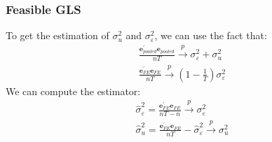 \documentclass{article}
\begin{document}
\subsubsection{Feasible GLS}
To get the estimation of $\sigma^2_u$ and $\sigma^2_{\varepsilon}$, we can use the fact that:
	\begin{align*}
		\frac{\boldsymbol{e}^\prime_{pooled} \boldsymbol{e}_{pooled}}{nT} \xrightarrow{p} \sigma^2_{\varepsilon} + \sigma^2_u\\
		\frac{\boldsymbol{e}^\prime_{FE} \boldsymbol{e}_{FE}}{nT} \xrightarrow{p} (1 - \frac{1}{T})\sigma^2_\varepsilon
	\end{align*}
We can compute the estimator:
	\begin{align*}
		\hat{\sigma}^2_\varepsilon = \frac{\boldsymbol{e}^\prime_{FE} \boldsymbol{e}_{FE}}{nT - n} \xrightarrow{p} \sigma^2_\varepsilon\\
		\hat{\sigma}^2_u = \frac{\boldsymbol{e}^\prime_{FE} \boldsymbol{e}_{FE}}{nT} - \hat{\sigma}^2_\varepsilon \xrightarrow{p} \sigma^2_u
	\end{align*}
\end{document}
